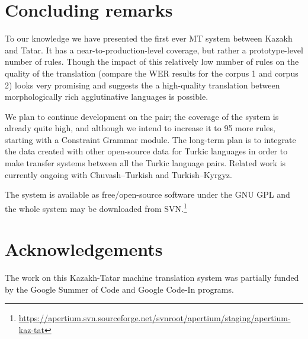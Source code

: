 \documentclass[11pt]{article}
\begin{document}



\section{Concluding remarks}
\label{sec:conc}

To our knowledge we have presented the first ever MT system between Kazakh and Tatar. It has a near-to-production-level
coverage, but rather a prototype-level number of rules. Though the impact of this relatively low number of rules on the
quality of the translation (compare the WER results for the corpus 1 and corpus 2) looks very promising and suggests
the a high-quality translation between morphologically rich agglutinative languages is possible.

We plan to continue development on the pair; the coverage of the system is already quite high, and although we intend to
increase it to 95%
more rules, starting with a Constraint Grammar module.
The long-term plan is to integrate the data created with other open-source data for Turkic languages in order to make
transfer systems between all the Turkic language pairs.  Related work is currently ongoing with Chuvash--Turkish and Turkish--Kyrgyz.

The system is available as free/open-source software under the GNU GPL and the whole system may be downloaded
from SVN.\footnote{\url{https://apertium.svn.sourceforge.net/svnroot/apertium/staging/apertium-kaz-tat}}

\section*{Acknowledgements}

The work on this Kazakh-Tatar machine translation system was partially funded by the Google Summer of Code and Google Code-In programs.

%
%

%

\end{document}
